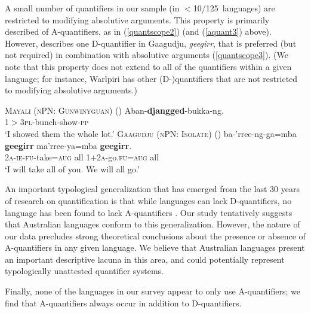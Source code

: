 \documentclass[12pt,egregdoesnotlikesansseriftitles]{scrartcl}
\makeatletter
\newcommand{\ofy}{/125} %
\makeatother
\begin{document}
A small number of quantifiers in our sample (in $<$10\ofy \ languages) are restricted to modifying absolutive arguments. This property is primarily described of A-quantifiers, as in (\ref{quantscope2}) (and (\ref{aquant3}) above). However, \cite{harvey92} describes one D-quantifier in Gaagudju, \textit{geegirr}, that is preferred (but not required) in combination with absolutive arguments (\ref{quantscope3}). (We note that this property does not extend to all of the quantifiers within a given language; for instance, Warlpiri has other (D-)quantifiers that are not restricted to modifying absolutive arguments.)

\begin{exe}
  \ex \textsc{Mayali (nPN: Gunwinyguan)} \hfill(\citealt[233]{evans95})
  \gll Aban-\textbf{djangged}-bukka-ng.\\
  1$>$3\textsc{pl}-bunch-show-\textsc{pp}\\
  \glt `I showed them the whole lot.' \label{quantscope2}
    \ex  \textsc{Gaagudju (nPN: Isolate)} \hfill(\citealt[307]{harvey92})
  \gll ba-'rree-ng-ga=mba \textbf{geegirr} ma'rree-ya=mba \textbf{geegirr}.\\ 
  2\textsc{a-ie-fu}-take=\textsc{aug} all 1+2\textsc{a}-go.\textsc{fu=aug} all\\
  \glt `I will take all of you. We will all go.' \label{quantscope3}
\end{exe}


An important typological generalization that has emerged from the last 30 years of research on quantification is that while languages can lack D-quantifiers, no language has been found to lack A-quantifiers \citep{introqnl}. Our study tentatively suggests that Australian languages  conform to this generalization. However, the nature of our data precludes strong theoretical conclusions about the presence or absence of A-quantifiers in any given language. We believe that Australian languages present an important descriptive lacuna in this area, and could potentially represent typologically unattested quantifier systems.

Finally, none of the languages in our survey appear to only use A-quantifiers; we find that A-quantifiers always  occur in addition to D-quantifiers.  
\end{document}
